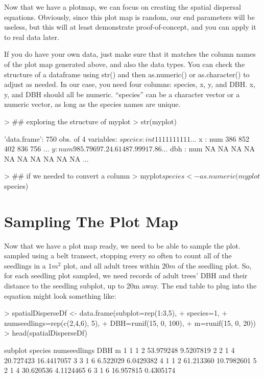\documentclass{article}
\begin{document}
Now that we have a plotmap, we can focus on creating the spatial dispersal equations. Obviously, since this plot map is random, our end parameters will be useless, but this will at least demonstrate proof-of-concept, and you can apply it to real data later.

If you do have your own data, just make sure that it matches the column names of the plot map generated above, and also the data types. You can check the structure of a dataframe using str() and then as.numeric() or as.character() to adjust as needed. In our case, you need four columns: species, x, y, and DBH. x, y, and DBH should all be numeric. ``species'' can be a character vector or a numeric vector, as long as the species names are unique.

\begin{Schunk}
\begin{Sinput}
> ## exploring the structure of myplot
> str(myplot)
\end{Sinput}
\begin{Soutput}
'data.frame':	750 obs. of  4 variables:
 $ species: int  1 1 1 1 1 1 1 1 1 1 ...
 $ x      : num  386 852 402 836 756 ...
 $ y      : num  985.79 697.2 4.61 487.99 917.86 ...
 $ dbh    : num  NA NA NA NA NA NA NA NA NA NA ...
\end{Soutput}
\begin{Sinput}
> ## if we needed to convert a column
> myplot$species <- as.numeric(myplot$species)
\end{Sinput}
\end{Schunk}


\section{Sampling The Plot Map}

Now that we have a plot map ready, we need to be able to sample the plot.  \citet{Ribbens1994} sampled using a belt transect, stopping every so often to count all of the seedlings in a $1 m^2$ plot, and all adult trees within $20m$ of the seedling plot. So, for each seedling plot sampled, we need records of adult trees' DBH and their distance to the seedling subplot, up to 20m away. The end table to plug into the equation might look something like:

\begin{Schunk}
\begin{Sinput}
> spatialDisperseDf <- data.frame(subplot=rep(1:3,5),
+                                 species=1,
+                                 numseedlings=rep(c(2,4,6), 5),
+                                 DBH=runif(15, 0, 100),
+                                 m=runif(15, 0, 20))
> head(spatialDisperseDf)
\end{Sinput}
\begin{Soutput}
  subplot species numseedlings       DBH          m
1       1       1            2 53.979248  9.5207819
2       2       1            4 20.727423 16.4417057
3       3       1            6  6.522029  6.0429382
4       1       1            2 61.213360 10.7982601
5       2       1            4 30.620536  4.1124465
6       3       1            6 16.957815  0.4305174
\end{Soutput}
\end{Schunk}
\end{document}
